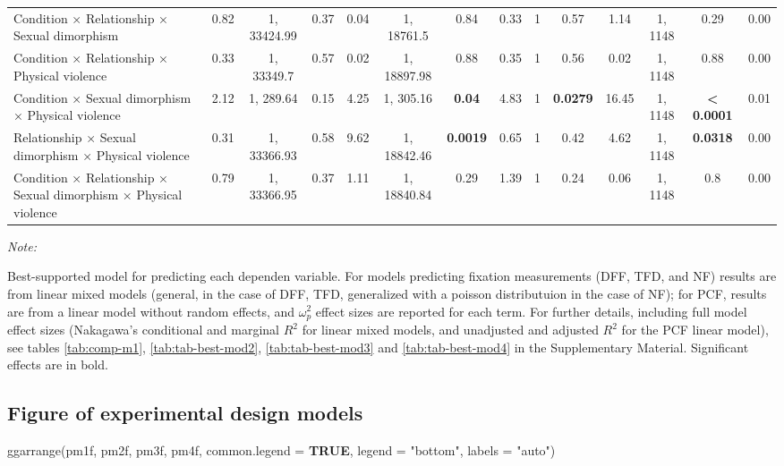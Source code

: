 \documentclass[
  bookmarksnumbered]{article}
\newenvironment{Shaded}{\begin{snugshade}}{\end{snugshade}}
\newcommand{\AttributeTok}[1]{\textcolor[rgb]{0.80,0.80,0.80}{#1}}
\newcommand{\ConstantTok}[1]{\textcolor[rgb]{0.86,0.64,0.64}{\textbf{#1}}}
\newcommand{\FunctionTok}[1]{\textcolor[rgb]{0.94,0.94,0.56}{#1}}
\newcommand{\NormalTok}[1]{\textcolor[rgb]{0.80,0.80,0.80}{#1}}
\newcommand{\StringTok}[1]{\textcolor[rgb]{0.80,0.58,0.58}{#1}}
\begin{document}
\begin{table}[H]
{\begin{threeparttable}
\begin{tabular}[t]{lccccccccccccc}
Condition × Relationship × Sexual dimorphism & 0.82 & 1, 33424.99 & 0.37 & 0.04 & 1, 18761.5 & 0.84 & 0.33 & 1 & 0.57 & 1.14 & 1, 1148 & 0.29 & 0.00\\
Condition × Relationship × Physical violence & 0.33 & 1, 33349.7 & 0.57 & 0.02 & 1, 18897.98 & 0.88 & 0.35 & 1 & 0.56 & 0.02 & 1, 1148 & 0.88 & 0.00\\
Condition × Sexual dimorphism × Physical violence & 2.12 & 1, 289.64 & 0.15 & 4.25 & 1, 305.16 & \textbf{0.04} & 4.83 & 1 & \textbf{0.0279} & 16.45 & 1, 1148 & \textbf{< 0.0001} & 0.01\\
Relationship × Sexual dimorphism × Physical violence & 0.31 & 1, 33366.93 & 0.58 & 9.62 & 1, 18842.46 & \textbf{0.0019} & 0.65 & 1 & 0.42 & 4.62 & 1, 1148 & \textbf{0.0318} & 0.00\\
Condition × Relationship × Sexual dimorphism × Physical violence & 0.79 & 1, 33366.95 & 0.37 & 1.11 & 1, 18840.84 & 0.29 & 1.39 & 1 & 0.24 & 0.06 & 1, 1148 & 0.8 & 0.00\\
\bottomrule
\end{tabular}
\begin{tablenotes}[para]
\item \textit{Note: } 
\item Best-supported model for predicting each dependen variable. 
  For models predicting fixation measurements (DFF, TFD, and NF) results 
  are from linear mixed models (general, in the case of DFF, TFD, generalized with a poisson
  distributuion in the case of NF); for PCF, results are from a linear model without 
  random effects, and $\omega^2_p$ effect sizes are reported for each term. For further 
  details, including full model effect sizes (Nakagawa's conditional and marginal $R^2$ for 
  linear mixed models, and unadjusted and adjusted $R^2$ for the PCF linear model), 
  see tables \ref{tab:comp-m1}, \ref{tab:tab-best-mod2}, \ref{tab:tab-best-mod3} 
  and \ref{tab:tab-best-mod4} in the Supplementary Material. 
  Significant effects are in bold.
\end{tablenotes}
\end{threeparttable}}
\end{table}

\subsection{Figure of experimental design models}\label{figure-of-experimental-design-models-1}

\begin{Shaded}
\begin{Highlighting}[]
\FunctionTok{ggarrange}\NormalTok{(pm1f, pm2f, pm3f, pm4f,}
          \AttributeTok{common.legend =} \ConstantTok{TRUE}\NormalTok{,}
          \AttributeTok{legend =} \StringTok{"bottom"}\NormalTok{,}
          \AttributeTok{labels =} \StringTok{"auto"}\NormalTok{)}
\end{Highlighting}
\end{Shaded}
\end{document}
